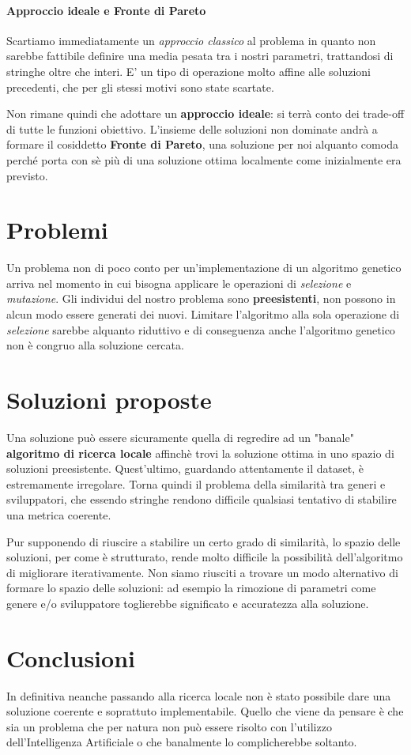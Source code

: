     \paragraph{Approccio ideale e Fronte di Pareto}
    Scartiamo immediatamente un \textit{approccio classico} al problema in quanto non sarebbe fattibile definire una media pesata tra i nostri parametri, trattandosi di stringhe oltre che interi. E' un tipo di operazione molto affine alle soluzioni precedenti, che per gli stessi motivi sono state scartate.
    
    Non rimane quindi che adottare un \textbf{approccio ideale}: si terrà conto dei trade-off di tutte le funzioni obiettivo. L'insieme delle soluzioni non dominate andrà a formare il cosiddetto \textbf{Fronte di Pareto}, una soluzione per noi alquanto comoda perché porta con sè più di una soluzione ottima localmente come inizialmente era previsto.
    
    \section{Problemi}
    Un problema non di poco conto per un'implementazione di un algoritmo genetico arriva nel momento in cui bisogna applicare le operazioni di \textit{selezione} e \textit{mutazione}. Gli individui del nostro problema sono \textbf{preesistenti}, non possono in alcun modo essere generati dei nuovi. Limitare l'algoritmo alla sola operazione di \textit{selezione} sarebbe alquanto riduttivo e di conseguenza anche l'algoritmo genetico non è congruo alla soluzione cercata.
    
    \section{Soluzioni proposte}
    Una soluzione può essere sicuramente quella di regredire ad un "banale" \textbf{algoritmo di ricerca locale} affinchè trovi la soluzione ottima in uno spazio di soluzioni preesistente. Quest'ultimo, guardando attentamente il dataset, è estremamente irregolare. Torna quindi il problema della similarità tra generi e sviluppatori, che essendo stringhe rendono difficile qualsiasi tentativo di stabilire una metrica coerente. 
    
    Pur supponendo di riuscire a stabilire un certo grado di similarità, lo spazio delle soluzioni, per come è strutturato, rende molto difficile la possibilità dell'algoritmo di migliorare iterativamente. Non siamo riusciti a trovare un modo alternativo di formare lo spazio delle soluzioni: ad esempio la rimozione di parametri come genere e/o sviluppatore toglierebbe significato e accuratezza alla soluzione.
    
    \section{Conclusioni}
    In definitiva neanche passando alla ricerca locale non è stato possibile dare una soluzione coerente e soprattuto implementabile. Quello che viene da pensare è che sia un problema che per natura non può essere risolto con l'utilizzo dell'Intelligenza Artificiale o che banalmente lo complicherebbe soltanto.